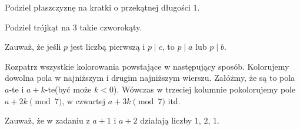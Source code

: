 
\begin{hints_list}
	\item *
	\item Podziel płaszczyznę na kratki o przekątnej długości $1$.
	\item Podziel trójkąt na $3$ takie czworokąty. 
	\item Zauważ, że jeśli $p$ jest liczbą pierwszą i $p\mid c$, to $p\mid a$ lub $p\mid b$.
	\item Rozpatrz wszystkie kolorowania powstające w następujący sposób. Kolorujemy dowolna pola w najniższym i drugim najniższym wierszu. Załóżmy, że są to pola $a$-te i $a + k$-te(być może $k < 0$). Wówczas w trzeciej kolumnie pokolorujemy pole $a + 2k \pmod{7}$, w czwartej $a + 3k \pmod{7}$ itd. 
	\item Zauważ, że w zadaniu z $a + 1$ i $a + 2$ działają liczby $1$, $2$, $1$.
\end{hints_list}